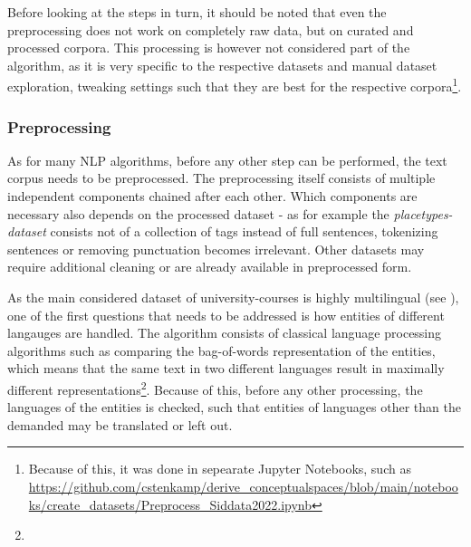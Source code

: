 

Before looking at the steps in turn, it should be noted that even the preprocessing does not work on completely raw data, but on curated and processed corpora. This processing is however not considered part of the algorithm, as it is very specific to the respective datasets and manual dataset exploration, tweaking settings such that they are best for the respective corpora\footnote{Because of this, it was done in sepearate Jupyter Notebooks, such as \url{https://github.com/cstenkamp/derive_conceptualspaces/blob/main/notebooks/create_datasets/Preprocess_Siddata2022.ipynb} }. %


\subsubsection{Preprocessing}

As for many NLP algorithms, before any other step can be performed, the text corpus needs to be preprocessed. The preprocessing itself consists of multiple independent components chained after each other. Which components are necessary also depends on the processed dataset - as for example the \emph{placetypes-dataset} consists not of a collection of tags instead of full sentences, tokenizing sentences or removing punctuation becomes irrelevant. Other datasets may require additional cleaning or are already available in preprocessed form.

As the main considered dataset of university-courses is highly multilingual (see ), one of the first questions that needs to be addressed is how entities of different langauges are handled. The algorithm consists of classical language processing algorithms such as comparing the bag-of-words representation of the entities, which means that the same text in two different languages result in maximally different representations\footnote{}. Because of this, before any other processing, the languages of the entities is checked, such that entities of languages other than the demanded may be translated or left out.

